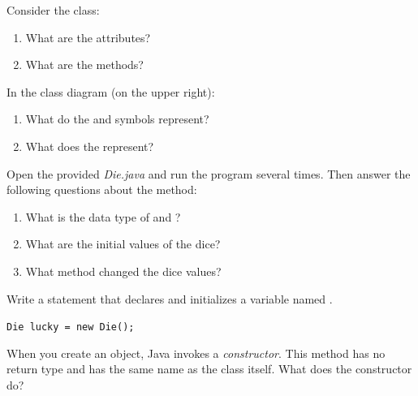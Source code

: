 \Q Consider the  class:

\begin{enumerate}
\item What are the attributes?

\item What are the methods?
\end{enumerate}


\Q In the class diagram (on the upper right):

\begin{enumerate}
\item What do the \java{+} and \java{-} symbols represent?

\item What does the \java{:} represent?
\end{enumerate}


\Q Open the provided \textit{Die.java} and run the program several times.
Then answer the following questions about the  method:
\begin{enumerate}
\item What is the data type of  and ?

\item What are the initial values of the dice?

\item What method changed the dice values?
\end{enumerate}


\Q \label{dievar}
Write a statement that declares and initializes a  variable named .

\begin{answer}[3em]
\tt Die lucky = new Die();
\end{answer}


%


\Q When you create an object, Java invokes a \emph{constructor}.
This method has no return type and has the same name as the class itself.
What does the  constructor do?

